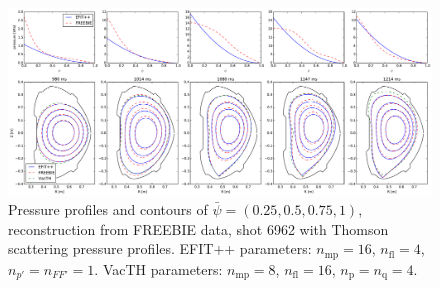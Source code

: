 \begin{figure}
\centering   %
\hfill{}
\includegraphics[width=18cm]{figures/example_6962_TS_noise.pdf}
\hfill{}
\caption{Pressure profiles and contours of $\bar\psi=\left(0.25,0.5,0.75,1\right)$, reconstruction from FREEBIE data, shot 6962 with Thomson scattering pressure profiles. EFIT++ parameters: $n_\mathrm{mp} = 16$, $n_\mathrm{fl} = 4$, $n_{p'} = n_{FF'} = 1$. VacTH parameters: $n_\mathrm{mp} = 8$, $n_\mathrm{fl} = 16$, $n_{\mathrm p} = n_{\mathrm q} = 4$.}
\label{fig:ex6962}
\end{figure}

